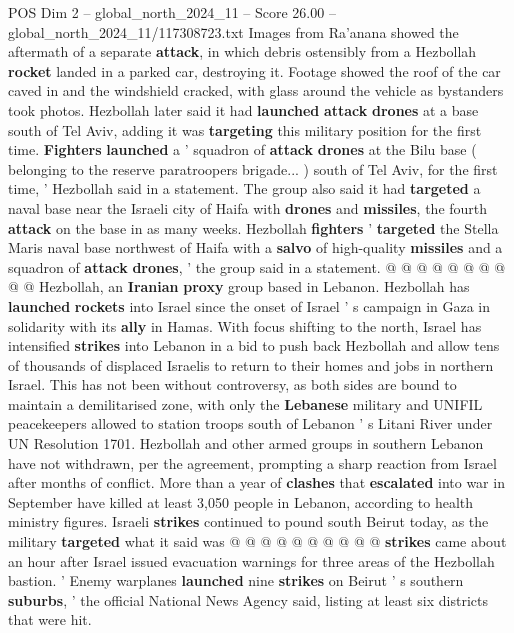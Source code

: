 \begin{textsample}{POS Dim 2 – global\_north\_2024\_11 – Score 26.00 – global\_north\_2024\_11/117308723.txt}  \label{ex:f2_pos_253}
Images from Ra'anana showed the aftermath of a separate \textbf{attack}, in which debris ostensibly from a Hezbollah \textbf{rocket} landed in a parked car, destroying it.
Footage showed the roof of the car caved in and the windshield cracked, with glass around the vehicle as bystanders took photos.
Hezbollah later said it had \textbf{launched} \textbf{attack} \textbf{drones} at a base south of Tel Aviv, adding it was \textbf{targeting} this military position for the first time. \textbf{Fighters} \textbf{launched} a ' squadron of \textbf{attack} \textbf{drones} at the Bilu base ( belonging to the reserve paratroopers brigade... ) south of Tel Aviv, for the first time, ' Hezbollah said in a statement.
The group also said it had \textbf{targeted} a naval base near the Israeli city of Haifa with \textbf{drones} and \textbf{missiles}, the fourth \textbf{attack} on the base in as many weeks.
Hezbollah \textbf{fighters} ' \textbf{targeted} the Stella Maris naval base northwest of Haifa with a \textbf{salvo} of high-quality \textbf{missiles} and a squadron of \textbf{attack} \textbf{drones}, ' the group said in a statement. @ @ @ @ @ @ @ @ @ @ Hezbollah, an \textbf{Iranian} \textbf{proxy} group based in Lebanon.
Hezbollah has \textbf{launched} \textbf{rockets} into Israel since the onset of Israel ' s campaign in Gaza in solidarity with its \textbf{ally} in Hamas.
With focus shifting to the north, Israel has intensified \textbf{strikes} into Lebanon in a bid to push back Hezbollah and allow tens of thousands of displaced Israelis to return to their homes and jobs in northern Israel.
This has not been without controversy, as both sides are bound to maintain a demilitarised zone, with only the \textbf{Lebanese} military and UNIFIL peacekeepers allowed to station troops south of Lebanon ' s Litani River under UN Resolution 1701.
Hezbollah and other armed groups in southern Lebanon have not withdrawn, per the agreement, prompting a sharp reaction from Israel after months of conflict.
More than a year of \textbf{clashes} that \textbf{escalated} into war in September have killed at least 3,050 people in Lebanon, according to health ministry figures.
Israeli \textbf{strikes} continued to pound south Beirut today, as the military \textbf{targeted} what it said was @ @ @ @ @ @ @ @ @ @ \textbf{strikes} came about an hour after Israel issued evacuation warnings for three areas of the Hezbollah bastion. ' Enemy warplanes \textbf{launched} nine \textbf{strikes} on Beirut ' s southern \textbf{suburbs}, ' the official National News Agency said, listing at least six districts that were hit.

\end{textsample}
